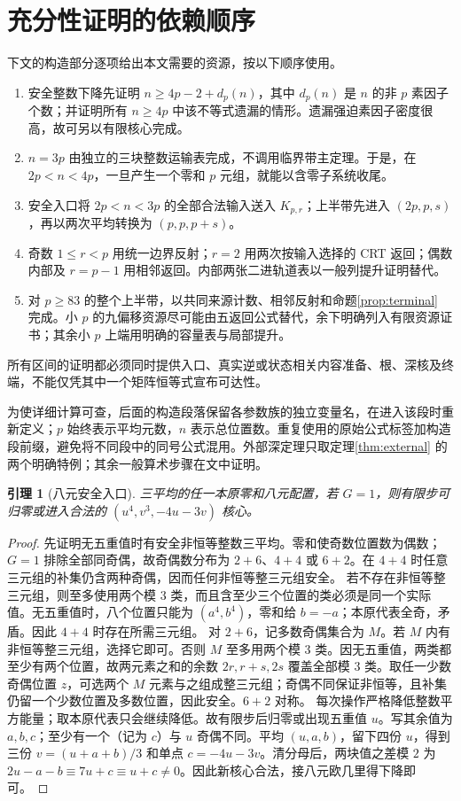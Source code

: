 \documentclass[11pt,a4paper]{article}
\newtheorem{lemma}[theorem]{引理}
\theoremstyle{definition}
\numberwithin{equation}{section}
\begin{document}
\section{充分性证明的依赖顺序}\label{sec:assembly}
下文的构造部分逐项给出本文需要的资源，按以下顺序使用。
\begin{enumerate}
\item 安全整数下降先证明 $n\ge4p-2+d_p(n)$，其中 $d_p(n)$ 是 $n$ 的非 $p$ 素因子个数；并证明所有 $n\ge4p$ 中该不等式遗漏的情形。遗漏强迫素因子密度很高，故可另以有限核心完成。
\item $n=3p$ 由独立的三块整数运输表完成，不调用临界带主定理。于是，在 $2p<n<4p$，一旦产生一个零和 $p$ 元组，就能以含零子系统收尾。
\item 安全入口将 $2p<n<3p$ 的全部合法输入送入 $K_{p,r}$；上半带先进入 $(2p,p,s)$，再以两次平均转换为 $(p,p,p+s)$。
\item 奇数 $1\le r<p$ 用统一边界反射；$r=2$ 用两次按输入选择的 CRT 返回；偶数内部及 $r=p-1$ 用相邻返回。内部两张二进轨道表以一般列提升证明替代。
\item 对 $p\ge83$ 的整个上半带，以共同来源计数、相邻反射和命题\ref{prop:terminal} 完成。小 $p$ 的九偏移资源尽可能由五返回公式替代，余下明确列入有限资源证书；其余小 $p$ 上端用明确的容量表与局部提升。
\end{enumerate}
所有区间的证明都必须同时提供入口、真实逆或状态相关内容准备、根、深核及终端，不能仅凭其中一个矩阵恒等式宣布可达性。

为使详细计算可查，后面的构造段落保留各参数族的独立变量名，在进入该段时重新定义；$p$ 始终表示平均元数，$n$ 表示总位置数。重复使用的原始公式标签加构造段前缀，避免将不同段中的同号公式混用。外部深定理只取定理\ref{thm:external} 的两个明确特例；其余一般算术步骤在文中证明。

\begin{lemma}[八元安全入口]\label{lem:eight-entry}
三平均的任一本原零和八元配置，若 $G=1$，则有限步可归零或进入合法的 $(u^4,v^3,-4u-3v)$ 核心。
\end{lemma}
\begin{proof}
先证明无五重值时有安全非恒等整数三平均。零和使奇数位置数为偶数；$G=1$ 排除全部同奇偶，故奇偶数分布为 $2+6$、$4+4$ 或 $6+2$。在 $4+4$ 时任意三元组的补集仍含两种奇偶，因而任何非恒等整三元组安全。
若不存在非恒等整三元组，则至多使用两个模 $3$ 类，而且含至少三个位置的类必须是同一个实际值。无五重值时，八个位置只能为 $(a^4,b^4)$，零和给 $b=-a$；本原代表全奇，矛盾。因此 $4+4$ 时存在所需三元组。
对 $2+6$，记多数奇偶集合为 $M$。若 $M$ 内有非恒等整三元组，选择它即可。否则 $M$ 至多用两个模 $3$ 类。因无五重值，两类都至少有两个位置，故两元素之和的余数 $2r,r+s,2s$ 覆盖全部模 $3$ 类。取任一少数奇偶位置 $z$，可选两个 $M$ 元素与之组成整三元组；奇偶不同保证非恒等，且补集仍留一个少数位置及多数位置，因此安全。$6+2$ 对称。
每次操作严格降低整数平方能量；取本原代表只会继续降低。故有限步后归零或出现五重值 $u$。写其余值为 $a,b,c$；至少有一个（记为 $c$）与 $u$ 奇偶不同。平均 $(u,a,b)$，留下四份 $u$，得到三份 $v=(u+a+b)/3$ 和单点 $c=-4u-3v$。清分母后，两块值之差模 $2$ 为 $2u-a-b\equiv7u+c\equiv u+c\ne0$。因此新核心合法，接八元欧几里得下降即可。
\end{proof}
\end{document}
